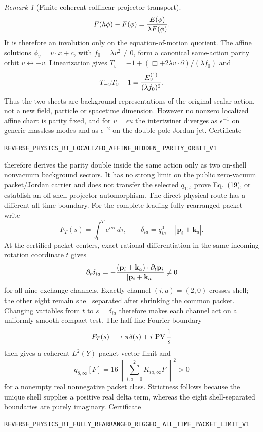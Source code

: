 \documentclass[11pt]{article}
\theoremstyle{definition}
\theoremstyle{remark}
\newtheorem{remark}[theorem]{Remark}
\begin{document}
\begin{remark}[Finite coherent collinear projector transport]
\[ F(h\phi)-F(\phi)={E(\phi)\over\lambda F(\phi)}.
\]
It is therefore an involution only on the equation-of-motion quotient.  The
affine solutions \(\phi_v=v\mathbin{\cdot}x+c\), with
\(f_0=\lambda v^2\ne0\), form a canonical same-action parity orbit
\(v\leftrightarrow-v\).  Linearization gives
\(T_v=-1+(\Box+2\lambda v\mathbin{\cdot}\partial)/(\lambda f_0)\) and
\[
 T_{-v}T_v-1={E_v^{(1)}\over(\lambda f_0)^2}.
\]
Thus the two sheets are background representations of the original scalar
action, not a new field, particle or spacetime dimension.  However no nonzero
localized affine chart is parity fixed, and for \(v=\epsilon u\) the
intertwiner diverges as \(\epsilon^{-1}\) on generic massless modes and as
\(\epsilon^{-2}\) on the double-pole Jordan jet.  Certificate
\par\noindent
\texttt{REVERSE\_PHYSICS\_BT\_LOCALIZED\_AFFINE\_HIDDEN\_}
\allowbreak\texttt{PARITY\_ORBIT\_V1}
\par\noindent
therefore derives the parity double inside the same action only as two
on-shell nonvacuum background sectors.  It has no strong limit on the public
zero-vacuum packet/Jordan carrier and does not transfer the selected
\(q_{10}\), prove Eq.~(19), or establish an off-shell projector automorphism.
The direct physical route has a different all-time boundary.  For the
complete leading fully rearranged packet write
\[
 F_T(s)=\int_0^T e^{is\tau}\,d\tau,\qquad
 \delta_{ia}=q_{ia}^0-|\mathbf p_i+\mathbf k_a|.
\]
At the certified packet centers, exact rational differentiation in the same
incoming rotation coordinate \(t\) gives
\[
 \partial_t\delta_{ia}
 =-{(\mathbf p_i+\mathbf k_a)\mathbin{\cdot}
 \partial_t\mathbf p_i\over|\mathbf p_i+\mathbf k_a|}\ne0
\]
for all nine exchange channels.  Exactly channel \((i,a)=(2,0)\) crosses
shell; the other eight remain shell separated after shrinking the common
packet.  Changing variables from \(t\) to \(s=\delta_{ia}\) therefore makes
each channel act on a uniformly smooth compact test.  The half-line Fourier
boundary
\[
 F_T(s)\longrightarrow
 \pi\delta(s)+i\,\operatorname{PV}{1\over s}
\]
then gives a coherent \(L^2(Y)\) packet-vector limit and
\[
 \boxed{
 q_{8,\infty}[F]
 =16\left\|\sum_{i,a=0}^2K_{ia,\infty}F\right\|^2>0}
\]
for a nonempty real nonnegative packet class.  Strictness follows because
the unique shell supplies a positive real delta term, whereas the eight
shell-separated boundaries are purely imaginary.  Certificate
\par\noindent
\texttt{REVERSE\_PHYSICS\_BT\_FULLY\_REARRANGED\_RIGGED\_}
\allowbreak\texttt{ALL\_TIME\_PACKET\_LIMIT\_V1}

\end{remark}
\end{document}
